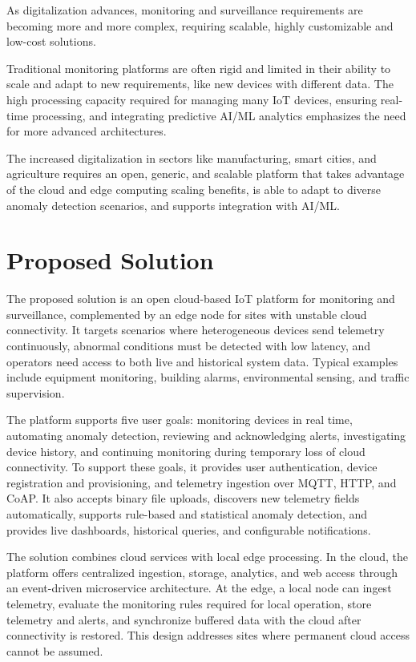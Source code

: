 As digitalization advances, monitoring and surveillance requirements are
becoming more and more complex, requiring scalable, highly customizable and
low-cost solutions.

Traditional monitoring platforms are often rigid and limited in their ability
to scale and adapt to new requirements, like new devices with different data.
The high processing capacity required for managing many \gls{IoT} devices,
ensuring real-time processing, and integrating predictive \gls{AI}/\gls{ML}
analytics emphasizes the need for more advanced architectures.

The increased digitalization in sectors like manufacturing, smart cities,
and agriculture requires an open, generic, and scalable platform that takes
advantage of the cloud and edge computing scaling benefits, is able to
adapt to diverse anomaly detection scenarios, and supports integration with
\gls{AI}/\gls{ML}.
\section{Proposed Solution}

The proposed solution is an open cloud-based \gls{IoT} platform for monitoring
and surveillance, complemented by an edge node for sites with unstable cloud
connectivity. It targets scenarios where heterogeneous devices send telemetry
continuously, abnormal conditions must be detected with low latency, and
operators need access to both live and historical system data. Typical
examples include equipment monitoring, building alarms, environmental sensing,
and traffic supervision.

The platform supports five user goals: monitoring devices in real time,
automating anomaly detection, reviewing and acknowledging alerts,
investigating device history, and continuing monitoring during temporary loss
of cloud connectivity. To support these goals, it provides user
authentication, device registration and provisioning, and telemetry ingestion
over \gls{MQTT}, \gls{HTTP}, and \gls{CoAP}. It also accepts binary file
uploads, discovers new telemetry fields automatically, supports rule-based and
statistical anomaly detection, and provides live dashboards, historical
queries, and configurable notifications.

The solution combines cloud services with local edge processing. In the cloud,
the platform offers centralized ingestion, storage, analytics, and web access
through an event-driven microservice architecture. At the edge, a local node
can ingest telemetry, evaluate the monitoring rules required for local
operation, store telemetry and alerts, and synchronize buffered data with the
cloud after connectivity is restored. This design addresses sites where
permanent cloud access cannot be assumed.

